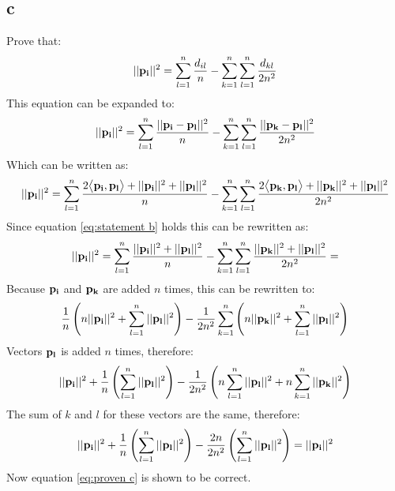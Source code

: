 \documentclass[a4paper,12pt]{article}
\begin{document}
\subsection{c}
Prove that:
\begin{equation}
\begin{aligned}
||{\bf p_i}||^2=\sum_{l=1}^n \frac{d_{il}}{n}-\sum^{n}_{k=1}\sum_{l=1}^n\frac{d_{kl}}{2n^2}
\end{aligned}
\label{eq:proven c}
\end{equation}
This equation can be expanded to:
\begin{equation}
\begin{aligned}
||{\bf p_i}||^2=\sum_{l=1}^n \frac{||{\bf p_i-p_l}||^2}{n}-\sum^{n}_{k=1}\sum_{l=1}^n\frac{||{\bf p_k-p_l}||^2}{2n^2}
\end{aligned}
\end{equation}
Which can be written as:
\begin{equation}
\begin{aligned}
||{\bf p_i}||^2=\sum_{l=1}^n \frac{2\big \langle{\bf p_i,p_l}\big \rangle+||{\bf p_i}||^2+||{\bf p_l}||^2}{n}-\sum^{n}_{k=1}\sum_{l=1}^n\frac{2\big \langle{\bf p_k,p_l}\big \rangle+||{\bf p_k}||^2+||{\bf p_l}||^2}{2n^2}
\end{aligned}
\end{equation}
Since equation \ref{eq:statement b} holds this can be rewritten as:
\begin{equation}
\begin{aligned}
||{\bf p_i}||^2=
\sum_{l=1}^n \frac{||{\bf p_i}||^2+||{\bf p_l}||^2}{n}-\sum^{n}_{k=1}\sum_{l=1}^n\frac{||{\bf p_k}||^2+||{\bf p_l}||^2}{2n^2}=
\end{aligned}
\end{equation}
Because ${\bf p_i}$ and ${\bf p_k}$ are added $n$ times, this can be rewritten to:
\begin{equation}
\begin{aligned}
\frac{1}{n}\left(n ||{\bf p_i}||^2 + \sum_{l=1}^n ||{\bf p_l}||^2 \right)-\frac{1}{2n^2} \sum_{k=1}^n \left(n ||{\bf p_k}||^2  + \sum^{n}_{l=1} ||{\bf p_l}||^2 \right)
\end{aligned}
\end{equation}
Vectors ${\bf p_l}$ is added $n$ times, therefore:
\begin{equation}
\begin{aligned}
||{\bf p_i}||^2+\frac{1}{n}\left(\sum_{l=1}^n ||{\bf p_l}||^2 \right)-\frac{1}{2n^2}\left( n \sum_{l=1}^n ||{\bf p_l}||^2+n \sum_{k=1}^n ||{\bf p_k}||^2 \right)
\end{aligned}
\end{equation}
The sum of $k$ and $l$ for these vectors are the same, therefore:
\begin{equation}
\begin{aligned}
||{\bf p_i}||^2+\frac{1}{n}\left(\sum_{l=1}^n ||{\bf p_l}||^2 \right)-\frac{2n}{2n^2}\left(  \sum_{l=1}^n ||{\bf p_l}||^2 \right)=||{\bf p_i}||^2
\end{aligned}
\end{equation}
Now equation \ref{eq:proven c} is shown to be correct. 
\end{document}

